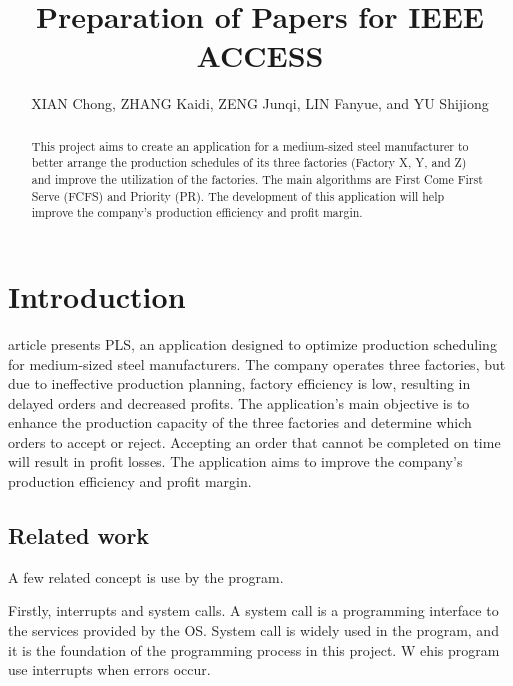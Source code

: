 \documentclass{ieeeaccess}
\begin{document}

\title{Preparation of Papers for IEEE ACCESS}

\author{XIAN Chong, ZHANG
    Kaidi, ZENG Junqi, LIN Fanyue, and YU Shijiong}

\address[1]{22097486D}
\address[2]{22100265D}
\address[3]{22099611D}
\address[4]{22099314D}
\address[5]{22107027D}

\begin{abstract}
This project aims to create an application for a medium-sized steel manufacturer to better arrange the production schedules of its three factories (Factory X, Y, and Z) and improve the utilization of the factories. The main algorithms are First Come First Serve (FCFS) and Priority (PR). The development of this application will help improve the company's production efficiency and profit margin.
\end{abstract}

\titlepgskip=-21pt

\maketitle

\section{Introduction}
\label{sec:introduction}
 article presents PLS, an application designed to optimize production scheduling for medium-sized steel manufacturers. The company operates three factories, but due to ineffective production planning, factory efficiency is low, resulting in delayed orders and decreased profits. The application's main objective is to enhance the production capacity of the three factories and determine which orders to accept or reject. Accepting an order that cannot be completed on time will result in profit losses. The application aims to improve the company's production efficiency and profit margin.

\subsection{Related work}
A few related concept is use by the program.

Firstly, interrupts and system calls. A system call is a programming interface to the services provided by the OS. System call is widely used in the program, and it is the foundation of the programming process in this project. W ehis program use interrupts when errors occur.
\end{document}
